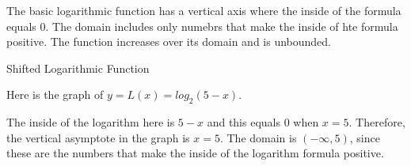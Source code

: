 \documentclass{ximera}
\begin{document}
The basic logarithmic function has a vertical axis where the inside of the formula equals $0$.  The domain includes only numebrs that make the inside of hte formula positive. The function increases over its domain and is unbounded.













\begin{example} Shifted Logarithmic Function



Here is the graph of $y = L(x) = log_2(5-x)$.

\begin{image}
\end{image}




The inside of the logarithm here is $5-x$ and this equals $0$ when $x=5$.  Therefore, the vertical asymptote in the graph is $x=5$.  The domain is $(-\infty, 5)$, since these are the numbers that make the inside of the logarithm formula positive.





\end{example}
\end{document}
